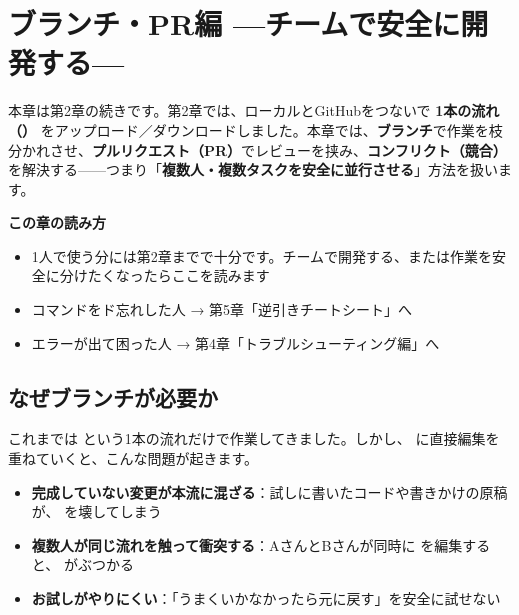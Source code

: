 \chapter{ブランチ・PR編 —チームで安全に開発する—}

本章は第2章の続きです。第2章では、ローカルとGitHubをつないで \textbf{1本の流れ（）} をアップロード／ダウンロードしました。本章では、\textbf{ブランチ}で作業を枝分かれさせ、\textbf{プルリクエスト（PR）}でレビューを挟み、\textbf{コンフリクト（競合）}を解決する——つまり「\textbf{複数人・複数タスクを安全に並行させる}」方法を扱います。

\begin{hintbox}
\textbf{この章の読み方}
\begin{itemize}[leftmargin=1.4em, nosep]
  \item 1人で使う分には第2章までで十分です。チームで開発する、または作業を安全に分けたくなったらここを読みます
  \item コマンドをド忘れした人 → 第5章「逆引きチートシート」へ
  \item エラーが出て困った人 → 第4章「トラブルシューティング編」へ
\end{itemize}
\end{hintbox}

\section{なぜブランチが必要か}

これまでは  という1本の流れだけで作業してきました。しかし、 に直接編集を重ねていくと、こんな問題が起きます。

\begin{itemize}[leftmargin=1.4em]
  \item \textbf{完成していない変更が本流に混ざる}：試しに書いたコードや書きかけの原稿が、 を壊してしまう
  \item \textbf{複数人が同じ流れを触って衝突する}：AさんとBさんが同時に  を編集すると、 がぶつかる
  \item \textbf{お試しがやりにくい}：「うまくいかなかったら元に戻す」を安全に試せない
\end{itemize}


